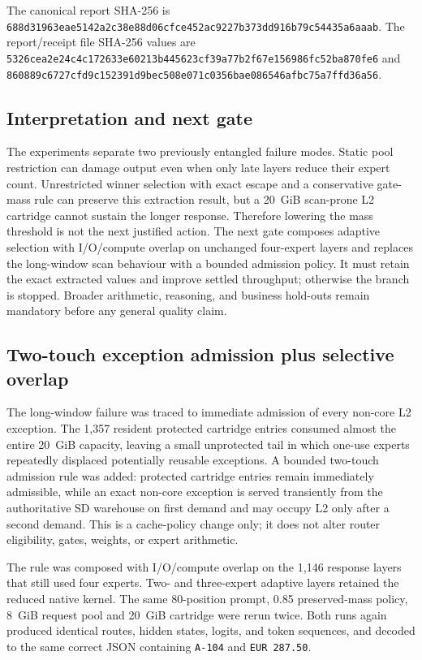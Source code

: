 The canonical report SHA-256 is
\texttt{688d31963eae5142a2c38e88d06cfce452ac9227b373dd916b79c54435a6aaab}.
The report/receipt file SHA-256 values are
\texttt{5326cea2e24c4c172633e60213b445623cf39a77b2f67e156986fc52ba870fe6}
and
\texttt{860889c6727cfd9c152391d9bec508e071c0356bae086546afbc75a7ffd36a56}.

\subsection{Interpretation and next gate}

The experiments separate two previously entangled failure modes.  Static pool
restriction can damage output even when only late layers reduce their expert
count.  Unrestricted winner selection with exact escape and a conservative
gate-mass rule can preserve this extraction result, but a 20~GiB scan-prone L2
cartridge cannot sustain the longer response.  Therefore lowering the mass
threshold is not the next justified action.  The next gate composes adaptive
selection with I/O/compute overlap on unchanged four-expert layers and replaces
the long-window scan behaviour with a bounded admission policy.  It must retain
the exact extracted values and improve settled throughput; otherwise the branch
is stopped.  Broader arithmetic, reasoning, and business hold-outs remain
mandatory before any general quality claim.

\subsection{Two-touch exception admission plus selective overlap}

The long-window failure was traced to immediate admission of every non-core L2
exception.  The 1,357 resident protected cartridge entries consumed almost the
entire 20~GiB capacity, leaving a small unprotected tail in which one-use
experts repeatedly displaced potentially reusable exceptions.  A bounded
two-touch admission rule was added: protected cartridge entries remain
immediately admissible, while an exact non-core exception is served transiently
from the authoritative SD warehouse on first demand and may occupy L2 only
after a second demand.  This is a cache-policy change only; it does not alter
router eligibility, gates, weights, or expert arithmetic.

The rule was composed with I/O/compute overlap on the 1,146 response layers
that still used four experts.  Two- and three-expert adaptive layers retained
the reduced native kernel.  The same 80-position prompt, 0.85 preserved-mass
policy, 8~GiB request pool and 20~GiB cartridge were rerun twice.  Both runs
again produced identical routes, hidden states, logits, and token sequences,
and decoded to the same correct JSON containing \texttt{A-104} and
\texttt{EUR 287.50}.

